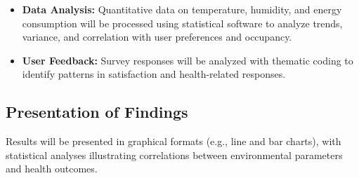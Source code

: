 \documentclass[a4paper]{scrartcl}
\begin{document}
\begin{itemize}
    \item \textbf{Data Analysis:} Quantitative data on temperature, humidity, and
energy consumption will be processed using statistical software to analyze trends, variance, and correlation with user preferences and occupancy.
\end{itemize}

\begin{itemize}
    \item \textbf{User Feedback:} Survey responses will be analyzed with thematic coding to identify patterns in satisfaction and health-related responses.
\end{itemize}

\subsection{Presentation of Findings}
Results will be presented in graphical formats (e.g., line and bar charts), with statistical analyses illustrating correlations between environmental parameters and health outcomes.
\end{document}
